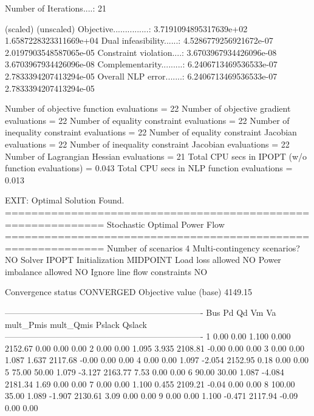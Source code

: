 Number of Iterations....: 21

                                   (scaled)                 (unscaled)
Objective...............:   3.7191094895317639e+02    1.6587228323311669e+04
Dual infeasibility......:   4.5286779256921672e-07    2.0197903548587065e-05
Constraint violation....:   3.6703967934426096e-08    3.6703967934426096e-08
Complementarity.........:   6.2406713469536533e-07    2.7833394207413294e-05
Overall NLP error.......:   6.2406713469536533e-07    2.7833394207413294e-05


Number of objective function evaluations             = 22
Number of objective gradient evaluations             = 22
Number of equality constraint evaluations            = 22
Number of inequality constraint evaluations          = 22
Number of equality constraint Jacobian evaluations   = 22
Number of inequality constraint Jacobian evaluations = 22
Number of Lagrangian Hessian evaluations             = 21
Total CPU secs in IPOPT (w/o function evaluations)   =      0.043
Total CPU secs in NLP function evaluations           =      0.013

EXIT: Optimal Solution Found.
=============================================================
Stochastic Optimal Power Flow
=============================================================
Number of scenarios                 4
Multi-contingency scenarios?        NO
Solver                              IPOPT
Initialization                      MIDPOINT
Load loss allowed                   NO
Power imbalance allowed             NO
Ignore line flow constraints        NO

Convergence status                  CONVERGED
Objective value (base)              4149.15

----------------------------------------------------------------------
Bus        Pd      Qd      Vm      Va      mult_Pmis      mult_Qmis      Pslack         Qslack        
----------------------------------------------------------------------
1         0.00    0.00   1.100   0.000      2152.67         0.00         0.00         0.00
2         0.00    0.00   1.095   3.935      2108.81        -0.00         0.00         0.00
3         0.00    0.00   1.087   1.637      2117.68        -0.00         0.00         0.00
4         0.00    0.00   1.097  -2.054      2152.95         0.18         0.00         0.00
5        75.00   50.00   1.079  -3.127      2163.77         7.53         0.00         0.00
6        90.00   30.00   1.087  -4.084      2181.34         1.69         0.00         0.00
7         0.00    0.00   1.100   0.455      2109.21        -0.04         0.00         0.00
8       100.00   35.00   1.089  -1.907      2130.61         3.09         0.00         0.00
9         0.00    0.00   1.100  -0.471      2117.94        -0.09         0.00         0.00

